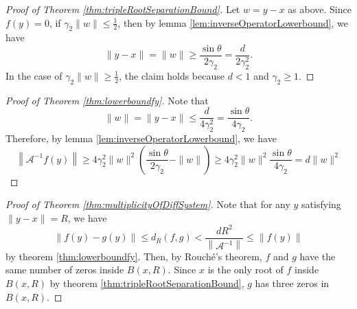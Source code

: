 \documentclass[12pt,oneside,reqno]{amsart}
\theoremstyle{definition}
\begin{document}
\begin{proof}[Proof of Theorem \ref{thm:tripleRootSeparationBound}]
	Let $w=y-x$ as above. Since $f(y)=0$, if $\gamma_2\|w\|\leq \frac{1}{2}$, then by lemma \ref{lem:inverseOperatorLowerbound}, we have
	\[\|y-x\|=\|w\|\geq\frac{\sin\theta}{2\gamma_2}=\frac{d}{2\gamma_2^2} .\]
	In the case of $\gamma_2\|w\|\geq \frac{1}{2}$, the claim holds because $d<1$ and $\gamma_2\geq 1$.
\end{proof}
\begin{proof}[Proof of Theorem \ref{thm:lowerboundfy}]
	Note that 
	\[\|w\|=\|y-x\|\leq \frac{d}{4\gamma_2^2}=\frac{\sin\theta}{4\gamma_2}.\]
	Therefore, by lemma \ref{lem:inverseOperatorLowerbound}, we have
	\[\left\|\mathcal{A}^{-1}f(y)\right\|\geq 4\gamma_2^2\|w\|^2\left(\frac{\sin\theta}{2\gamma_2}-\|w\|\right)\geq4\gamma_2^2\|w\|^2\frac{\sin\theta}{4\gamma_2}=d\|w\|^2\]
\end{proof}
\begin{proof}[Proof of Theorem \ref{thm:multiplicityOfDiffSystem}]
	Note that for any $y$ satisfying $\|y-x\|=R$, we have
	\[\|f(y)-g(y)\|\leq d_R(f,g)<\frac{dR^2}{\left\|\mathcal{A}^{-1}\right\|}\leq \|f(y)\|\]
	by theorem \ref{thm:lowerboundfy}. Then, by Rouch\'e's theorem, $f$ and $g$ have the same number of zeros inside $B(x,R)$. Since $x$ is the only root of $f$ inside $B(x,R)$ by theorem \ref{thm:tripleRootSeparationBound}, $g$ has three zeros in $B(x,R)$.
\end{proof}


	
\end{document}
